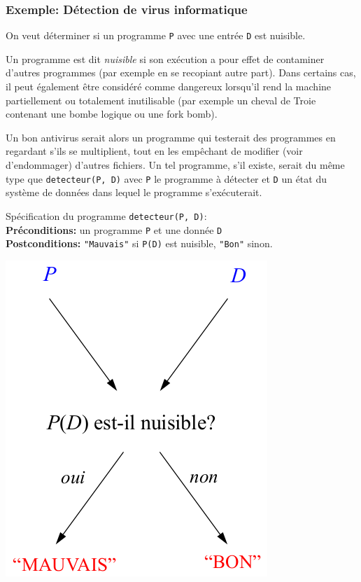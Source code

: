 \subsubsection{Exemple: Détection de virus informatique}
\label{subsubsec:detection_de_virus_informatique}
On veut déterminer si un programme \lstinline|P| avec une entrée \lstinline|D| est nuisible.

\begin{mydef}
	Un programme est dit \emph{nuisible} si son exécution a pour effet de contaminer d'autres programmes (par exemple en se recopiant autre part). Dans certains cas, il peut également être considéré comme dangereux lorsqu'il rend la machine partiellement ou totalement inutilisable (par exemple un cheval de Troie contenant une bombe logique ou une fork bomb).
\end{mydef}

Un bon antivirus serait alors un programme qui testerait des programmes en regardant s'ils se multiplient, tout en les empêchant de modifier (voir d'endommager) d'autres fichiers. Un tel programme, s'il existe, serait du même type que \lstinline|detecteur(P, D)| avec \lstinline|P| le programme à détecter et \lstinline|D| un état du système de données dans lequel le programme s'exécuterait.

\noindent Spécification du programme \lstinline|detecteur(P, D)|:\\
\textbf{Préconditions:} un programme \lstinline|P| et une donnée \lstinline|D|\\
\textbf{Postconditions:} \lstinline|"Mauvais"| si \lstinline|P(D)| est nuisible, \lstinline|"Bon"| sinon.

\begin{center}
\includegraphics[scale=0.45]{Images/effet_detecteur}
\end{center}

